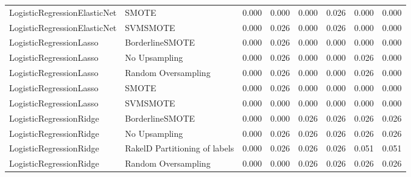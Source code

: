 \begin{tabular}{llllllll}
   LogisticRegressionElasticNet &                         SMOTE & 0.000 &                     0.000 &                 0.000 &                  0.026 &                                   0.000 &    0.000 \\
   LogisticRegressionElasticNet &                      SVMSMOTE & 0.000 &                     0.026 &                 0.000 &                  0.026 &                                   0.000 &    0.000 \\
        LogisticRegressionLasso &               BorderlineSMOTE & 0.000 &                     0.026 &                 0.000 &                  0.000 &                                   0.000 &    0.000 \\
        LogisticRegressionLasso &                 No Upsampling & 0.000 &                     0.026 &                 0.000 &                  0.000 &                                   0.026 &    0.000 \\
        LogisticRegressionLasso &           Random Oversampling & 0.000 &                     0.026 &                 0.000 &                  0.000 &                                   0.026 &    0.000 \\
        LogisticRegressionLasso &                         SMOTE & 0.000 &                     0.026 &                 0.000 &                  0.000 &                                   0.000 &    0.000 \\
        LogisticRegressionLasso &                      SVMSMOTE & 0.000 &                     0.000 &                 0.000 &                  0.000 &                                   0.000 &    0.000 \\
        LogisticRegressionRidge &               BorderlineSMOTE & 0.000 &                     0.000 &                 0.026 &                  0.026 &                                   0.026 &    0.026 \\
        LogisticRegressionRidge &                 No Upsampling & 0.000 &                     0.026 &                 0.026 &                  0.026 &                                   0.026 &    0.026 \\
        LogisticRegressionRidge & RakelD Partitioning of labels & 0.000 &                     0.026 &                 0.026 &                  0.026 &                                   0.051 &    0.051 \\
        LogisticRegressionRidge &           Random Oversampling & 0.000 &                     0.000 &                 0.026 &                  0.026 &                                   0.026 &    0.026 \\

\end{tabular}
